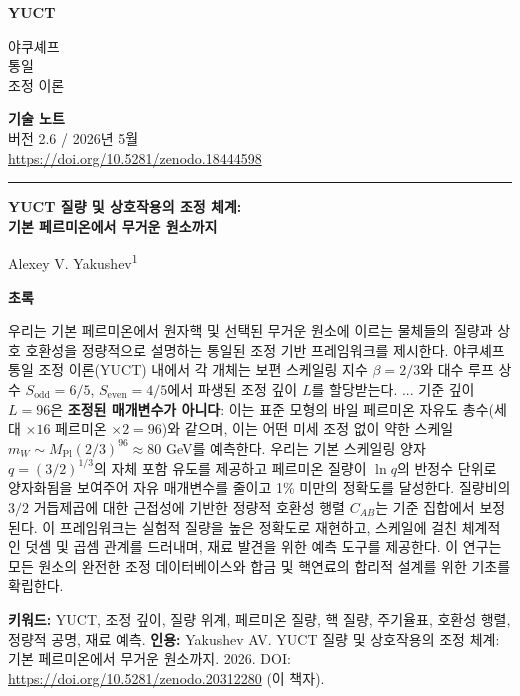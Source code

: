 \documentclass[11pt,a4paper]{article}
\newcommand{\makeheader}{%
	\noindent
	\begin{minipage}{0.17\textwidth}
		\raggedright
		{\sffamily\bfseries\color{skyblue}\fontsize{46}{46}\selectfont YUCT}%
	\end{minipage}%
	\hspace{30pt}
	\begin{minipage}{0.32\textwidth}
		\raggedright
		{\sffamily\fontsize{11}{13}\selectfont 야쿠셰프\\ 통일\\ 조정 이론}%
	\end{minipage}%
	\hfill
	\begin{minipage}{0.38\textwidth}
		\raggedleft
		{\sffamily\bfseries 기술 노트}\\ 
		{\sffamily 버전 2.6 / 2026년 5월}\\ 
		{\sffamily\footnotesize \url{https://doi.org/10.5281/zenodo.18444598}}%
	\end{minipage}
	\par\vspace{5pt}
	\noindent\textcolor{gold}{\rule{\textwidth}{1.6pt}}
	\par\vspace{0pt}
}
\begin{document}
	\thispagestyle{firstpage}
	\makeheader
	
	\vspace{0cm}
	{\LARGE\bfseries YUCT 질량 및 상호작용의 조정 체계:\\ 
		\Large 기본 페르미온에서 무거운 원소까지 \par}
	\vspace{0.2cm}
	
	{\large Alexey V. Yakushev\textsuperscript{1}} \\
	\vspace{0.0cm}
	
	{\color{darkblue}\textbf{\LARGE 초록}} \par
	{\large
		\noindent
		우리는 기본 페르미온에서 원자핵 및 선택된 무거운 원소에 이르는 물체들의 질량과 상호 호환성을 정량적으로 설명하는 통일된 조정 기반 프레임워크를 제시한다. 야쿠셰프 통일 조정 이론(YUCT) 내에서 각 개체는 보편 스케일링 지수 \(\beta = 2/3\)와 대수 루프 상수 \(S_{\mathrm{odd}}=6/5\), \(S_{\mathrm{even}}=4/5\)에서 파생된 조정 깊이 \(L\)를 할당받는다. ... 기준 깊이 \(L=96\)은 \textbf{조정된 매개변수가 아니다}: 이는 표준 모형의 바일 페르미온 자유도 총수(세대 $\times 16$ 페르미온 $\times 2 = 96$)와 같으며, 이는 어떤 미세 조정 없이 약한 스케일 $m_W \sim M_{\mathrm{Pl}}(2/3)^{96} \approx 80$ GeV를 예측한다. 우리는 기본 스케일링 양자 \(q = (3/2)^{1/3}\)의 자체 포함 유도를 제공하고 페르미온 질량이 \(\ln q\)의 반정수 단위로 양자화됨을 보여주어 자유 매개변수를 줄이고 1\% 미만의 정확도를 달성한다. 질량비의 \(3/2\) 거듭제곱에 대한 근접성에 기반한 정량적 호환성 행렬 \(C_{AB}\)는 기준 집합에서 보정된다. 이 프레임워크는 실험적 질량을 높은 정확도로 재현하고, 스케일에 걸친 체계적인 덧셈 및 곱셈 관계를 드러내며, 재료 발견을 위한 예측 도구를 제공한다. 이 연구는 모든 원소의 완전한 조정 데이터베이스와 합금 및 핵연료의 합리적 설계를 위한 기초를 확립한다.}
	
	\vspace{0.1cm}
	\noindent
	{\color{darkblue}\textbf{키워드:}} YUCT, 조정 깊이, 질량 위계, 페르미온 질량, 핵 질량, 주기율표, 호환성 행렬, 정량적 공명, 재료 예측.
	\vspace{0.1cm}
	\noindent
	{\color{darkblue}\textbf{인용:}} Yakushev AV. YUCT 질량 및 상호작용의 조정 체계: 기본 페르미온에서 무거운 원소까지. 2026. DOI: \url{https://doi.org/10.5281/zenodo.20312280} (이 책자).
	
	\vspace{0.4cm}
	
\end{document}
